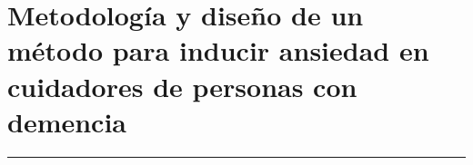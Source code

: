 \chapter{Metodolog\'ia y dise\~no de un m\'etodo para inducir ansiedad en cuidadores de personas con demencia}\label{capit:cap3}
\vspace{-2.0325ex}%
\noindent
\rule{\textwidth}{0.5pt}
\vspace{-5.5ex}%
\newcommand{\pushline}{\Indp}%

\newpage

